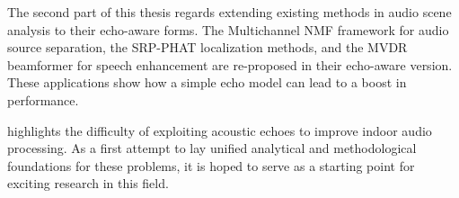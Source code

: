 \mynewline
The second part of this thesis regards extending existing methods in audio scene analysis to their echo-aware forms.
The Multichannel NMF framework for audio source separation, the SRP-PHAT localization methods, and the MVDR beamformer for speech enhancement
are re-proposed in their echo-aware version. These applications show how a simple echo model can lead to a boost in performance.

 highlights the difficulty of exploiting acoustic echoes to improve indoor audio processing.
As a first attempt to lay unified analytical and methodological foundations for these problems, it is hoped to serve as a starting point for exciting research in this field.

